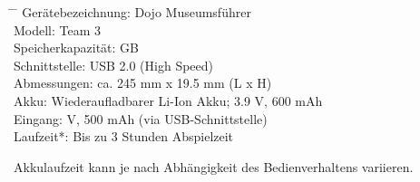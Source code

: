 \begin{tabbing}
\hspace{40mm}		\= \hspace{15mm} \=\kill
Gerätebezeichnung:	\> Dojo Museumsführer \\[4mm]
Modell:				\> Team 3 \\[4mm]
Speicherkapazität:	 GB \\[4mm]
Schnittstelle:		\> USB 2.0 (High Speed) \\[4mm]
Abmessungen:		\> ca. 245 mm x 19.5 mm (L x H) \\[4mm]
Akku:				\> Wiederaufladbarer Li-Ion Akku; 3.9 V, 600 mAh \\[4mm]
Eingang:			 V, 500 mAh (via USB-Schnittstelle) \\[4mm]
Laufzeit*:			\> Bis zu 3 Stunden Abspielzeit \\[4mm]
\end{tabbing}

\begin{description}
\item *Akkulaufzeit kann je nach Abhängigkeit des Bedienverhaltens variieren.
\end{description}